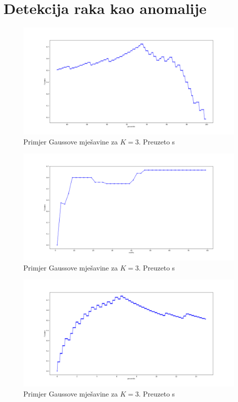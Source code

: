 \documentclass[utf8, diplomski, numeric]{fer}
\begin{document}
\section{Detekcija raka kao anomalije}

\begin{figure}[htb]
\includegraphics[width=1\textwidth]{images/cancer-kmeans-f1.png}
\centering
\caption{Primjer Gaussove mješavine za $K = 3$. Preuzeto s  \cite{GaussianMixtureExplained}}
\label{fig:cancer-kmeans}
\end{figure}

\begin{figure}[htb]
\includegraphics[width=1\textwidth]{images/cancer-dbscan-f1.png}
\centering
\caption{Primjer Gaussove mješavine za $K = 3$. Preuzeto s  \cite{GaussianMixtureExplained}}
\label{fig:cancer-dbscan}
\end{figure}

\begin{figure}[htb]
\includegraphics[width=1\textwidth]{images/cancer-gauss-f1.png}
\centering
\caption{Primjer Gaussove mješavine za $K = 3$. Preuzeto s  \cite{GaussianMixtureExplained}}
\label{fig:cancer-gauss}
\end{figure}
\end{document}
